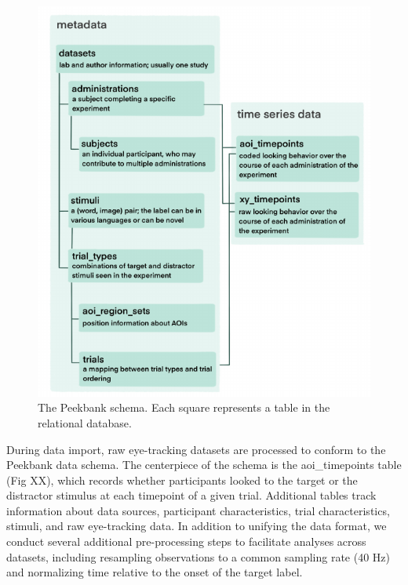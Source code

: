 \documentclass[
  english,
  man]{apa6}
\begin{document}
\begin{figure}

{\centering \includegraphics{peekbank-brm_files/figure-latex/fig-schema-1} 

}

\caption{The Peekbank schema. Each square represents a table in the relational database.}\label{fig:fig-schema}
\end{figure}

During data import, raw eye-tracking datasets are processed to conform to the Peekbank data schema. The centerpiece of the schema is the aoi\_timepoints table (Fig XX), which records whether participants looked to the target or the distractor stimulus at each timepoint of a given trial. Additional tables track information about data sources, participant characteristics, trial characteristics, stimuli, and raw eye-tracking data. In addition to unifying the data format, we conduct several additional pre-processing steps to facilitate analyses across datasets, including resampling observations to a common sampling rate (40 Hz) and normalizing time relative to the onset of the target label.
\end{document}
